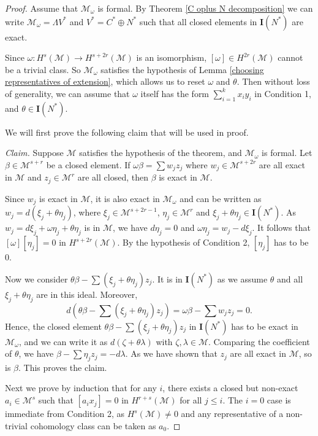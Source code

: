 \documentclass{article}
\theoremstyle{plain}
\theoremstyle{definition}
\theoremstyle{plain}
\numberwithin{equation}{section}
\begin{document}
\begin{proof}
Assume that $\mathcal{M}_{\omega}$ is formal. By Theorem \ref{C oplus N decomposition} we can write $\mathcal{M}_{\omega}=\Lambda V^*$ and $V^*=C^*\oplus N^*$ such that all closed elements in $\mathbf{I}(N^*)$ are exact. 

Since $\omega:H^s(\mathcal{M})\to H^{s+2r}(\mathcal{M})$ is an isomorphism, $[\omega]\in H^{2r}(\mathcal{M})$ cannot be a trivial class. So $\mathcal{M}_{\omega}$ satisfies the hypothesis of Lemma \ref{choosing representatives of extension}, which allows us to reset $\omega$ and $\theta$. Then without loss of generality, we can assume that $\omega$ itself has the form $\sum_{i=1}^k x_iy_i$ in Condition 1, and $\theta\in \mathbf{I}(N^*)$.

We will first prove the following claim that will be used in proof.

\noindent\textit{Claim.} Suppose $\mathcal{M}$ satisfies the hypothesis of the theorem, and $\mathcal{M}_{\omega}$ is formal. Let $\beta\in\mathcal{M}^{s+r}$ be a closed element. If $\omega\beta=\sum w_jz_j$ where $w_j\in\mathcal{M}^{s+2r}$ are all exact in $\mathcal{M}$ and $z_j\in\mathcal{M}^r$ are all closed, then $\beta$ is exact in $\mathcal{M}$.

Since $w_j$ is exact in $\mathcal{M}$, it is also exact in $\mathcal{M}_{\omega}$ and can be written as $w_j=d(\xi_j+\theta\eta_j)$, where $\xi_j\in\mathcal{M}^{s+2r-1}$, $\eta_j\in\mathcal{M}^r$ and $\xi_j+\theta\eta_j\in\mathbf{I}(N^*)$. As $w_j=d\xi_j+\omega\eta_j+\theta\eta_j$ is in $\mathcal{M}$, we have $d\eta_j=0$ and $\omega\eta_j=w_j-d\xi_j$. It follows that $[\omega][\eta_j]=0$ in $H^{s+2r}(\mathcal{M})$. By the hypothesis of Condition 2, $[\eta_j]$ has to be 0.

Now we consider $\theta\beta-\sum (\xi_j+\theta\eta_j)z_j$. It is in $\mathbf{I}(N^*)$ as we assume $\theta$ and all $\xi_j+\theta\eta_j$ are in this ideal. Moreover,
$$
d\left(\theta\beta-\sum (\xi_j+\theta\eta_j)z_j\right) = \omega\beta-\sum w_jz_j =0.
$$
Hence, the closed element $\theta\beta-\sum (\xi_j+\theta\eta_j)z_j$ in $\mathbf{I}(N^*)$ has to be exact in $\mathcal{M}_{\omega}$, and we can write it as $d(\zeta+\theta\lambda)$ with $\zeta,\lambda\in\mathcal{M}$. Comparing the coefficient of $\theta$, we have $\beta-\sum \eta_jz_j=-d\lambda$. As we have shown that $z_j$ are all exact in $\mathcal{M}$, so is $\beta$. This proves the claim.

Next we prove by induction that for any $i$, there exists a closed but non-exact $a_i\in\mathcal{M}^s$ such that $[a_ix_j]=0$ in $H^{r+s}(\mathcal{M})$ for all $j\leq i$. The $i=0$ case is immediate from Condition 2, as $H^s(\mathcal{M})\neq 0$ and any representative of a non-trivial cohomology class can be taken as $a_0$.


\end{proof}
\end{document}
